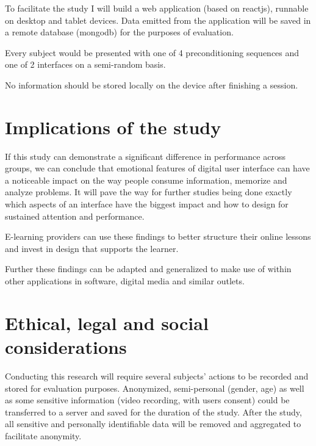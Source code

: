 To facilitate the study I will build a web application (based on reactjs), runnable on desktop and tablet devices. Data emitted from the application will be saved in a remote database (mongodb) for the purposes of evaluation.

Every subject would be presented with one of 4 preconditioning sequences and one of 2 interfaces on a semi-random basis.

No information should be stored locally on the device after finishing a session.

\section{Implications of the study}

If this study can demonstrate a significant difference in performance across groups, we can conclude that emotional features of digital user interface can have a noticeable impact on the way people consume information, memorize and analyze problems.
It will pave the way for further studies being done exactly which aspects of an interface have the biggest impact and how to design for sustained attention and performance.

E-learning providers can use these findings to better structure their online lessons and invest in design that supports the learner.

Further these findings can be adapted and generalized to make use of within other applications in software, digital media and similar outlets.

\section{Ethical, legal and social considerations}

Conducting this research will require several subjects' actions to be recorded and stored for evaluation purposes.
Anonymized, semi-personal (gender, age) as well as some sensitive information (video recording, with users consent) could be transferred to a server and saved for the duration of the study.
After the study, all sensitive and personally identifiable data will be removed and aggregated to facilitate anonymity.